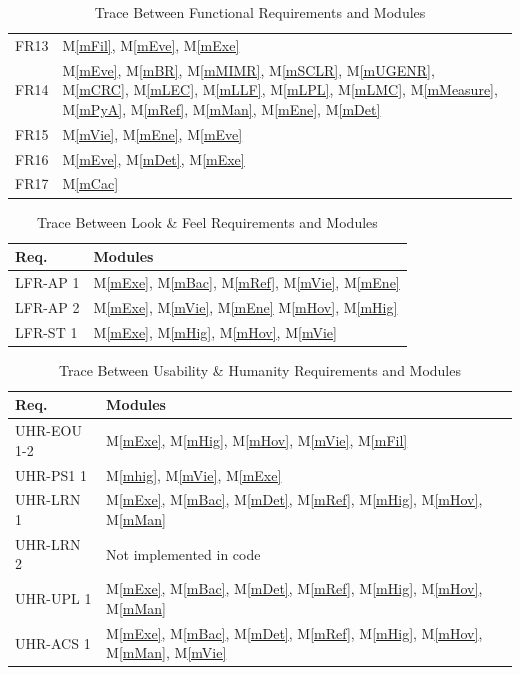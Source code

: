 \documentclass[12pt, titlepage]{article}
\newcommand{\mref}[1]{M\ref{#1}}
\begin{document}
\begin{table}[H]
\begin{tabular}{p{} p{}}
    FR13 & \mref{mFil}, \mref{mEve}, \mref{mExe} \\
    FR14 & \mref{mEve}, \mref{mBR}, \mref{mMIMR}, \mref{mSCLR}, \mref{mUGENR}, \mref{mCRC}, \mref{mLEC}, \mref{mLLF}, \mref{mLPL}, \mref{mLMC}, \mref{mMeasure}, \mref{mPyA}, \mref{mRef}, \mref{mMan}, \mref{mEne}, \mref{mDet} \\
    FR15 & \mref{mVie}, \mref{mEne}, \mref{mEve} \\
    FR16 & \mref{mEve}, \mref{mDet}, \mref{mExe} \\
    FR17 & \mref{mCac}\\
    \bottomrule
  \end{tabular}
  \caption{Trace Between Functional Requirements and Modules}
  \label{tab:fr-mod}
\end{table}

\begin{table}[H]
  \centering
  \begin{tabular}{p{} p{}}
    \toprule \textbf{Req.} & \textbf{Modules}\\
    \midrule
    LFR-AP 1 & \mref{mExe}, \mref{mBac}, \mref{mRef}, \mref{mVie}, \mref{mEne} \\ 
    LFR-AP 2 & \mref{mExe}, \mref{mVie}, \mref{mEne} \mref{mHov}, \mref{mHig} \\ 
    LFR-ST 1 & \mref{mExe}, \mref{mHig}, \mref{mHov}, \mref{mVie}\\
    \bottomrule
  \end{tabular}
  \caption{Trace Between Look \& Feel Requirements and Modules}
  \label{tab:LFR-mod}
\end{table}

\begin{table}[H]
  \centering
  \begin{tabular}{p{} p{}}
    \toprule \textbf{Req.} & \textbf{Modules}\\
    \midrule
    UHR-EOU 1-2 & \mref{mExe}, \mref{mHig}, \mref{mHov}, \mref{mVie}, \mref{mFil} \\

    UHR-PS1 1 & \mref{mhig}, \mref{mVie}, \mref{mExe} \\ 

    UHR-LRN 1 & \mref{mExe}, \mref{mBac}, \mref{mDet}, \mref{mRef}, \mref{mHig}, \mref{mHov}, \mref{mMan} \\ 
    UHR-LRN 2 & Not implemented in code \\ 

    UHR-UPL 1 & \mref{mExe}, \mref{mBac}, \mref{mDet}, \mref{mRef}, \mref{mHig}, \mref{mHov}, \mref{mMan} \\ 
    
    UHR-ACS 1 & \mref{mExe}, \mref{mBac}, \mref{mDet}, \mref{mRef}, \mref{mHig}, \mref{mHov}, \mref{mMan}, \mref{mVie} \\ 
    \bottomrule
  \end{tabular}
  \caption{Trace Between Usability \& Humanity Requirements and Modules}
  \label{tab:UHR-mod}
\end{table}
\end{document}
